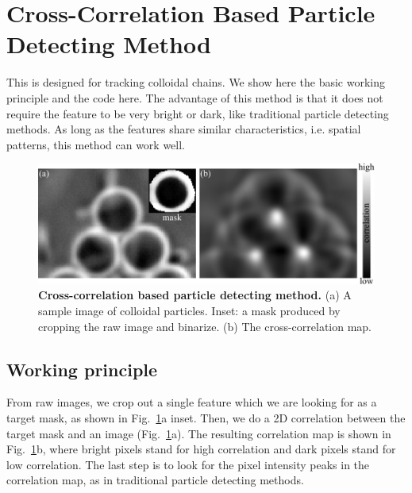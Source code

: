 \section{Cross-Correlation Based Particle Detecting Method}
\label{cross-correlation-tracking-method}
This is designed for tracking colloidal chains. We show here the basic working principle and the code here. The advantage of this method is that it does not require the feature to be very bright or dark, like traditional particle detecting methods. As long as the features share similar characteristics, i.e. spatial patterns, this method can work well.

\begin{figure}[h]
	\begin{center}
	\includegraphics[width=5.5in]{Figs/A-2/corrTrack.pdf}
	\end{center}
	\caption[Cross-correlation based particle detecting method]
	{
	\textbf{Cross-correlation based particle detecting method.}
  (a) A sample image of colloidal particles. Inset: a mask produced by cropping the raw image and binarize.
  (b) The cross-correlation map.
	}
	\label{fig:corr-track}
\end{figure}

\subsection{Working principle}
From raw images, we crop out a single feature which we are looking for as a target mask, as shown in Fig.~\ref{fig:corr-track}a inset. Then, we do a 2D correlation between the target mask and an image (Fig.~\ref{fig:corr-track}a). The resulting correlation map is shown in Fig.~\ref{fig:corr-track}b, where bright pixels stand for high correlation and dark pixels stand for low correlation. The last step is to look for the pixel intensity peaks in the correlation map, as in traditional particle detecting methods.



